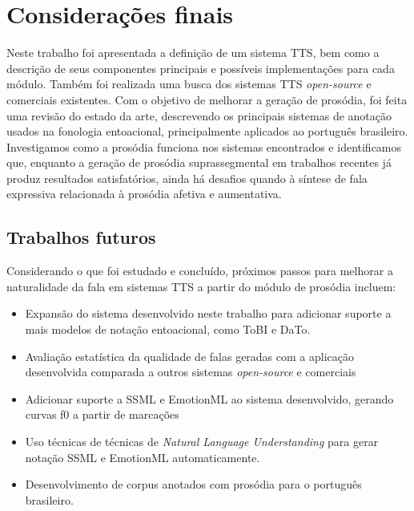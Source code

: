 
\chapter{Considerações finais}
Neste trabalho foi apresentada a definição de um sistema TTS, bem como a descrição
de seus componentes principais e possíveis implementações para cada módulo.
Também foi realizada uma busca dos sistemas TTS \emph{open-source} e comerciais
existentes. Com o objetivo de melhorar a geração de prosódia, foi feita uma
revisão do estado da arte, descrevendo os principais sistemas de anotação usados na
fonologia entoacional, principalmente aplicados ao português brasileiro.
Investigamos como a prosódia funciona nos sistemas encontrados e identificamos
que, enquanto a geração de prosódia suprassegmental em trabalhos recentes já
produz resultados satisfatórios, ainda há desafios quando à síntese de fala
expressiva relacionada à prosódia afetiva e aumentativa.

\section{Trabalhos futuros}
Considerando o que foi estudado e concluído, próximos passos para melhorar a
naturalidade da fala em sistemas TTS a partir do módulo de prosódia incluem:

\begin{itemize}
\item Expansão do sistema desenvolvido neste trabalho para adicionar suporte a
  mais modelos de notação entoacional, como ToBI e DaTo.
\item Avaliação estatística da qualidade de falas geradas com a aplicação desenvolvida comparada a outros sistemas \emph{open-source} e comerciais
\item Adicionar suporte a SSML e EmotionML ao sistema desenvolvido, gerando
  curvas f0 a partir de marcações
\item Uso técnicas de técnicas de \emph{Natural Language Understanding} para
  gerar notação SSML e EmotionML automaticamente.
\item Desenvolvimento de corpus anotados com prosódia para o português brasileiro.
\end{itemize}

